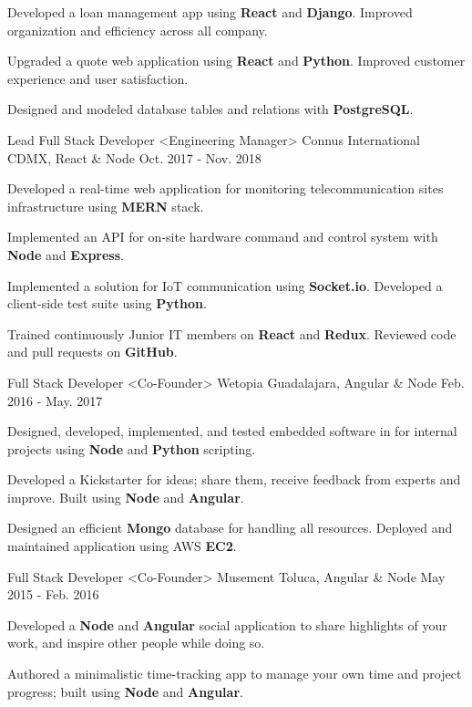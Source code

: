 \begin{cventries}
{\begin{cvitems}
        \item {Developed a loan management app using \textbf{React} and \textbf{Django}. Improved organization and efficiency across all company.}
        \item {Upgraded a quote web application using \textbf{React} and \textbf{Python}. Improved customer experience and user satisfaction.}
        \item {Designed and modeled database tables and relations with \textbf{PostgreSQL}.}
      \end{cvitems}
    }
  \cventry
    {Lead Full Stack Developer <Engineering Manager>}
    {Connus International}
    {CDMX, React \& Node}
    {Oct. 2017 - Nov. 2018}
    {
      \begin{cvitems}
        \item {Developed a real-time web application for monitoring telecommunication sites infrastructure using \textbf{MERN} stack.}
        \item {Implemented an API for on-site hardware command and control system with \textbf{Node} and \textbf{Express}.}
        \item {Implemented a solution for IoT communication using \textbf{Socket.io}. Developed a client-side test suite using \textbf{Python}.}
        \item {Trained continuously Junior IT members on \textbf{React} and \textbf{Redux}. Reviewed code and pull requests on \textbf{GitHub}.}
      \end{cvitems}
    }
    \cventry
      {Full Stack Developer <Co-Founder>}
      {Wetopia}
      {Guadalajara, Angular \& Node}
      {Feb. 2016 - May. 2017}
      {
        \begin{cvitems}
          \item{Designed, developed, implemented, and tested embedded software in for internal projects using \textbf{Node} and \textbf{Python} scripting.}
          \item {Developed a Kickstarter for ideas; share them, receive feedback from experts and improve. Built using \textbf{Node} and \textbf{Angular}.}
          \item {Designed an efficient \textbf{Mongo} database for handling all resources. Deployed and maintained application using AWS \textbf{EC2}.}
        \end{cvitems}
      }
      \cventry
        {Full Stack Developer <Co-Founder>}
        {Musement}
        {Toluca, Angular \& Node}
        {May 2015 - Feb. 2016}
        {
          \begin{cvitems}
            \item {Developed a \textbf{Node} and \textbf{Angular} social application to share highlights of your work, and inspire other people while doing so.}
            \item {Authored a minimalistic time-tracking app to manage your own time and project progress; built using \textbf{Node} and \textbf{Angular}.}
          \end{cvitems}
        }
  \end{cventries}
